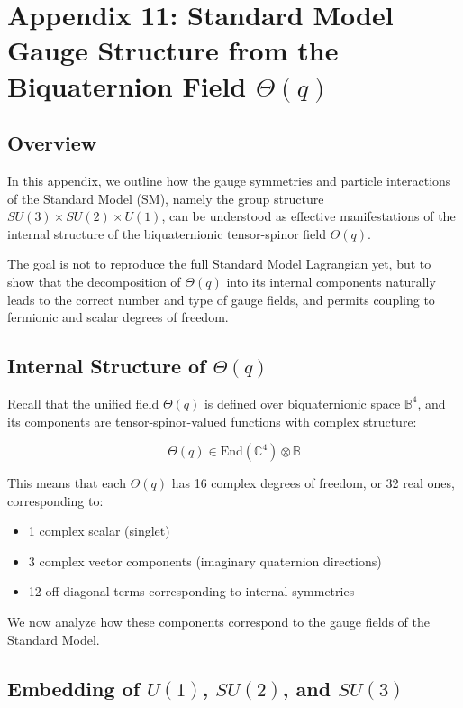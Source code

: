 
\section*{Appendix 11: Standard Model Gauge Structure from the Biquaternion Field \(\Theta(q)\)}

\subsection*{Overview}

In this appendix, we outline how the gauge symmetries and particle interactions of the Standard Model (SM),
namely the group structure \(SU(3) \times SU(2) \times U(1)\), can be understood as effective manifestations
of the internal structure of the biquaternionic tensor-spinor field \(\Theta(q)\).

The goal is not to reproduce the full Standard Model Lagrangian yet, but to show that the decomposition of 
\(\Theta(q)\) into its internal components naturally leads to the correct number and type of gauge fields, 
and permits coupling to fermionic and scalar degrees of freedom.

\subsection*{Internal Structure of \(\Theta(q)\)}

Recall that the unified field \(\Theta(q)\) is defined over biquaternionic space \(\mathbb{B}^4\), and its
components are tensor-spinor-valued functions with complex structure:

\[
\Theta(q) \in \text{End}(\mathbb{C}^4) \otimes \mathbb{B}
\]

This means that each \(\Theta(q)\) has 16 complex degrees of freedom, or 32 real ones, corresponding to:
\begin{itemize}
  \item 1 complex scalar (singlet)
  \item 3 complex vector components (imaginary quaternion directions)
  \item 12 off-diagonal terms corresponding to internal symmetries
\end{itemize}

We now analyze how these components correspond to the gauge fields of the Standard Model.

\subsection*{Embedding of \(U(1)\), \(SU(2)\), and \(SU(3)\)}

